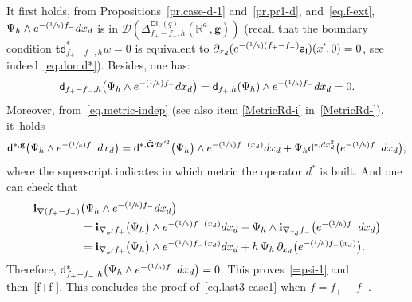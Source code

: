 \documentclass[10pt]{amsart}
\newcommand{\Psfrac}[2]{(\sfrac{#1}{#2})}
\newcommand{\mbf}[1]{\mathbf{#1}}
\theoremstyle{plain}
\theoremstyle{definition}
\begin{document}
It first holds, from Propositions~\ref{pr.case-d-1}
and~\ref{pr.pr1-d}, and~\eqref{eq.f-ext}, $\Psi_h \wedge e^{-\Psfrac 1h f_- }dx_d$ is in $\mathcal D(\Delta_{f_+ -f_-,h}^{\mathsf{Di},(q)}(\mathbb R_-^d, \mbf g))$ (recall that the boundary condition $\mbf t \mathsf d_{f_+-f-,h}^*w =0$ is equivalent to $\partial_{x_d}(e^{-\Psfrac 1h (f_+-f_-)}\mathsf a_{\mathsf I})(x',0)=0$, see indeed~\eqref{eq.domd*}).
Besides, one has:
\[
\mathsf d_{f_+-f_-,h}\bigl(\Psi_h\wedge e^{-\Psfrac 1h f_-}dx_d\bigr)= \mathsf d_{f_+,h}(\Psi_h) \wedge e^{-\Psfrac 1h f_-}dx_d=0.
\]
Moreover, from~\eqref{eq.metric-indep} (see also item \eqref{MetricRd-i}
in~\ref{MetricRd-}), it~holds
\[
\mathsf d^{*, { \mbf g}}\bigl(\Psi_h\wedge e^{-\Psfrac 1h f_-}dx_d\bigr)= \mathsf
d^{*,\tilde{ \mbf G}dx'^2}\bigl(\Psi_h\bigr) \wedge
e^{-\Psfrac 1h f_-(x_d)}dx_d+ \Psi_h \mathsf
d^{*, dx_d^2}\bigl(e^{-\Psfrac 1h f_-}dx_d\bigr),
\]
where the superscript indicates in which metric the operator $d^*$ is built.
And one can check that
\begin{align*}
\mbf i_{\nabla (f_+-f_-)}&\bigl(\Psi_h\wedge e^{-\Psfrac 1hf_-}dx_d\bigr)\\
&= \mbf i_{\nabla_{x'} f_+} \bigl(\Psi_h\bigr)\wedge e^{-\Psfrac 1h f_-(x_d)}dx_d-\Psi_h\wedge \mbf i_{\nabla_{x_d} f_-}\bigl(e^{-\Psfrac 1h f_-}dx_d\bigr)\\
&=\mbf i_{\nabla_{x'} f_+} \bigl(\Psi_h\bigr)\wedge e^{-\Psfrac 1h f_-(x_d)}dx_d+h\, \Psi_h \, \partial_{x_d}\bigl(e^{-\Psfrac 1h f_-(x_d)}\bigr).
\end{align*}
Therefore, $ \mathsf d^*_{f_+-f_-,h}\bigl(\Psi_h\wedge e^{-\Psfrac 1h f_-}dx_d\bigr)=0$.
This proves~\eqref{=psi-1} and then~\eqref{f+f-}. This concludes the proof of~\eqref{eq.last3-case1} when $f=f_+-f_-$.
\end{document}
